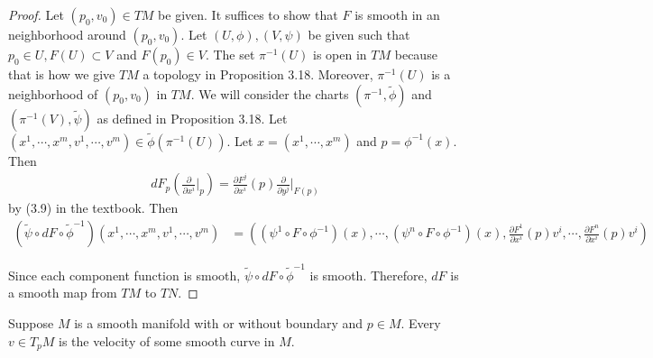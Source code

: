 \begin{proof}
  Let $(p_0, v_0) \in TM$ be given.
  It suffices to show that $F$ is smooth in an neighborhood around $(p_0, v_0)$.
  Let $(U, \phi), (V, \psi)$ be given such that $p_0 \in U, F(U) \subset V$ and $F(p_0) \in V$.
  The set $\pi^{-1}(U)$ is open in $TM$ because that is how we give $TM$ a topology in Proposition 3.18.
  Moreover, $\pi^{-1}(U)$ is a neighborhood of $(p_0, v_0)$ in $TM$.
  We will consider the charts $(\pi^{-1}, \tilde{\phi})$ and $(\pi^{-1}(V), \tilde{\psi})$ as defined in Proposition 3.18.
  Let $(x^1, \cdots, x^m, v^1, \cdots, v^m) \in \tilde{\phi}(\pi^{-1}(U))$.
  Let $x = (x^1, \cdots, x^m)$ and $p = \phi^{-1}(x)$.
  Then 
  \begin{align*}
    dF_{p}(\frac{\partial}{\partial x^i}\Big\vert_{p}) = \frac{\partial F^j}{\partial x^i}(p)\frac{\partial}{\partial y^j}\Big\vert_{F(p)}
  \end{align*}
  by (3.9) in the textbook.
  Then 
  \begin{align*}
    (\tilde{\psi} \circ dF \circ \tilde{\phi}^{-1})(x^1, \cdots, x^m, v^1, \cdots, v^m)
      &= ((\psi^1 \circ F \circ \phi^{-1})(x), \cdots, (\psi^n \circ F \circ \phi^{-1})(x), \frac{\partial F^1}{\partial x^i}(p)v^i, \cdots, \frac{\partial F^n}{\partial x^i}(p)v^i)
  \end{align*}

  Since each component function is smooth, $\tilde{\psi} \circ dF \circ \tilde{\phi}^{-1}$ is smooth.
  Therefore, $dF$ is a smooth map from $TM$ to $TN$.
\end{proof}

\begin{customthm}{3.23}
  Suppose $M$ is a smooth manifold with or without boundary and $p \in M$.
  Every $v \in T_pM$ is the velocity of some smooth curve in $M$.
\end{customthm}

